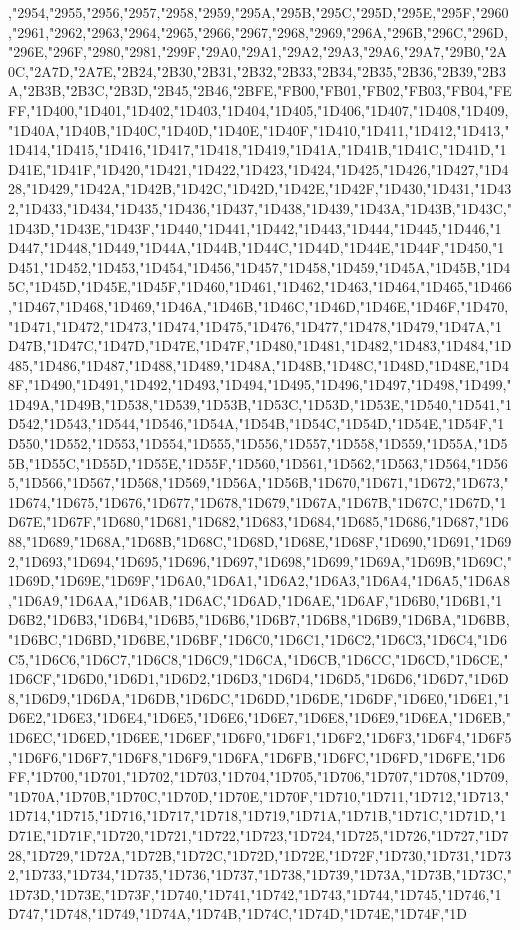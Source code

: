 ,"2954,"2955,"2956,"2957,"2958,"2959,"295A,"295B,"295C,"295D,"295E,"295F,"2960,"2961,"2962,"2963,"2964,"2965,"2966,"2967,"2968,"2969,"296A,"296B,"296C,"296D,"296E,"296F,"2980,"2981,"299F,"29A0,"29A1,"29A2,"29A3,"29A6,"29A7,"29B0,"2A0C,"2A7D,"2A7E,"2B24,"2B30,"2B31,"2B32,"2B33,"2B34,"2B35,"2B36,"2B39,"2B3A,"2B3B,"2B3C,"2B3D,"2B45,"2B46,"2BFE,"FB00,"FB01,"FB02,"FB03,"FB04,"FEFF,"1D400,"1D401,"1D402,"1D403,"1D404,"1D405,"1D406,"1D407,"1D408,"1D409,"1D40A,"1D40B,"1D40C,"1D40D,"1D40E,"1D40F,"1D410,"1D411,"1D412,"1D413,"1D414,"1D415,"1D416,"1D417,"1D418,"1D419,"1D41A,"1D41B,"1D41C,"1D41D,"1D41E,"1D41F,"1D420,"1D421,"1D422,"1D423,"1D424,"1D425,"1D426,"1D427,"1D428,"1D429,"1D42A,"1D42B,"1D42C,"1D42D,"1D42E,"1D42F,"1D430,"1D431,"1D432,"1D433,"1D434,"1D435,"1D436,"1D437,"1D438,"1D439,"1D43A,"1D43B,"1D43C,"1D43D,"1D43E,"1D43F,"1D440,"1D441,"1D442,"1D443,"1D444,"1D445,"1D446,"1D447,"1D448,"1D449,"1D44A,"1D44B,"1D44C,"1D44D,"1D44E,"1D44F,"1D450,"1D451,"1D452,"1D453,"1D454,"1D456,"1D457,"1D458,"1D459,"1D45A,"1D45B,"1D45C,"1D45D,"1D45E,"1D45F,"1D460,"1D461,"1D462,"1D463,"1D464,"1D465,"1D466,"1D467,"1D468,"1D469,"1D46A,"1D46B,"1D46C,"1D46D,"1D46E,"1D46F,"1D470,"1D471,"1D472,"1D473,"1D474,"1D475,"1D476,"1D477,"1D478,"1D479,"1D47A,"1D47B,"1D47C,"1D47D,"1D47E,"1D47F,"1D480,"1D481,"1D482,"1D483,"1D484,"1D485,"1D486,"1D487,"1D488,"1D489,"1D48A,"1D48B,"1D48C,"1D48D,"1D48E,"1D48F,"1D490,"1D491,"1D492,"1D493,"1D494,"1D495,"1D496,"1D497,"1D498,"1D499,"1D49A,"1D49B,"1D538,"1D539,"1D53B,"1D53C,"1D53D,"1D53E,"1D540,"1D541,"1D542,"1D543,"1D544,"1D546,"1D54A,"1D54B,"1D54C,"1D54D,"1D54E,"1D54F,"1D550,"1D552,"1D553,"1D554,"1D555,"1D556,"1D557,"1D558,"1D559,"1D55A,"1D55B,"1D55C,"1D55D,"1D55E,"1D55F,"1D560,"1D561,"1D562,"1D563,"1D564,"1D565,"1D566,"1D567,"1D568,"1D569,"1D56A,"1D56B,"1D670,"1D671,"1D672,"1D673,"1D674,"1D675,"1D676,"1D677,"1D678,"1D679,"1D67A,"1D67B,"1D67C,"1D67D,"1D67E,"1D67F,"1D680,"1D681,"1D682,"1D683,"1D684,"1D685,"1D686,"1D687,"1D688,"1D689,"1D68A,"1D68B,"1D68C,"1D68D,"1D68E,"1D68F,"1D690,"1D691,"1D692,"1D693,"1D694,"1D695,"1D696,"1D697,"1D698,"1D699,"1D69A,"1D69B,"1D69C,"1D69D,"1D69E,"1D69F,"1D6A0,"1D6A1,"1D6A2,"1D6A3,"1D6A4,"1D6A5,"1D6A8,"1D6A9,"1D6AA,"1D6AB,"1D6AC,"1D6AD,"1D6AE,"1D6AF,"1D6B0,"1D6B1,"1D6B2,"1D6B3,"1D6B4,"1D6B5,"1D6B6,"1D6B7,"1D6B8,"1D6B9,"1D6BA,"1D6BB,"1D6BC,"1D6BD,"1D6BE,"1D6BF,"1D6C0,"1D6C1,"1D6C2,"1D6C3,"1D6C4,"1D6C5,"1D6C6,"1D6C7,"1D6C8,"1D6C9,"1D6CA,"1D6CB,"1D6CC,"1D6CD,"1D6CE,"1D6CF,"1D6D0,"1D6D1,"1D6D2,"1D6D3,"1D6D4,"1D6D5,"1D6D6,"1D6D7,"1D6D8,"1D6D9,"1D6DA,"1D6DB,"1D6DC,"1D6DD,"1D6DE,"1D6DF,"1D6E0,"1D6E1,"1D6E2,"1D6E3,"1D6E4,"1D6E5,"1D6E6,"1D6E7,"1D6E8,"1D6E9,"1D6EA,"1D6EB,"1D6EC,"1D6ED,"1D6EE,"1D6EF,"1D6F0,"1D6F1,"1D6F2,"1D6F3,"1D6F4,"1D6F5,"1D6F6,"1D6F7,"1D6F8,"1D6F9,"1D6FA,"1D6FB,"1D6FC,"1D6FD,"1D6FE,"1D6FF,"1D700,"1D701,"1D702,"1D703,"1D704,"1D705,"1D706,"1D707,"1D708,"1D709,"1D70A,"1D70B,"1D70C,"1D70D,"1D70E,"1D70F,"1D710,"1D711,"1D712,"1D713,"1D714,"1D715,"1D716,"1D717,"1D718,"1D719,"1D71A,"1D71B,"1D71C,"1D71D,"1D71E,"1D71F,"1D720,"1D721,"1D722,"1D723,"1D724,"1D725,"1D726,"1D727,"1D728,"1D729,"1D72A,"1D72B,"1D72C,"1D72D,"1D72E,"1D72F,"1D730,"1D731,"1D732,"1D733,"1D734,"1D735,"1D736,"1D737,"1D738,"1D739,"1D73A,"1D73B,"1D73C,"1D73D,"1D73E,"1D73F,"1D740,"1D741,"1D742,"1D743,"1D744,"1D745,"1D746,"1D747,"1D748,"1D749,"1D74A,"1D74B,"1D74C,"1D74D,"1D74E,"1D74F,"1D